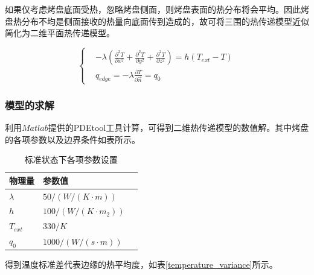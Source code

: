 \documentclass{my_paper}
\begin{document}
如果仅考虑烤盘底面受热，忽略烤盘侧面，则烤盘表面的热分布将会平均。因此烤盘热分布不均是侧面接收的热量向底面传到造成的，故可将三围的热传递模型近似简化为二维平面热传递模型。

\begin{equation}
    \left\{
    \begin{aligned}
         & -\lambda(\frac{\partial^{2} T}{\partial x^{2}}+\frac{\partial^{2} T}{\partial y^{2}}+\frac{\partial^{2} T}{\partial z^{2}})=h(T_{ext}-T) \\
         & q_{edge}=-\lambda \frac{\partial T}{\partial \vec{n}}=q_{0}
    \end{aligned}
    \right.
    \label{heat_tranfer_function}
\end{equation}



\subsubsection{模型的求解}

利用$Matlab$提供的PDEtool工具计算，可得到二维热传递模型的数值解。\cite{burstein2022pde}其中烤盘的各项参数以及边界条件如表所示。

\begin{table}[h]%
    \centering
    \caption{标准状态下各项参数设置}
    \begin{tabular}{p{2.0cm}<{\centering}p{9.0cm}<{\centering}p{2.0cm}<{\centering}}
        \hline
        物理量    & 参数值                   \\
        \hline
        $\lambda$ & $50/(W/(K\cdot m))$      \\
        $h$       & $100/(W/(K\cdot m_{2}))$ \\
        $T_{ext}$ & $330/K$                  \\
        $q_{0}$   & $1000/(W/(s\cdot m))$    \\
        \hline
    \end{tabular}
\end{table}


得到温度标准差代表边缘的热平均度，如表\ref{temperature_variance}所示\cite{songyankan}。
\end{document}
